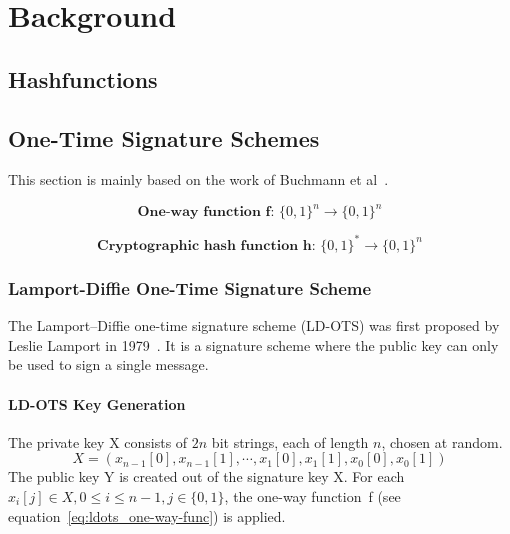 \chapter{Background}
\label{cha:background}


\section{Hashfunctions}

\section{One-Time Signature Schemes}
This section is mainly based on the work of Buchmann et al~\cite{book_pqc_bernstein_2004}.



\begin{equation}
\label{eq:ldots_one-way-func}
\textbf{One-way function f: } \lbrace 0,1 \rbrace^n \rightarrow \lbrace 0,1 \rbrace ^n
\end{equation}

\begin{equation}
\label{eq:ldots_basic_hashfunc}
\textbf{Cryptographic hash function h: } \lbrace 0,1 \rbrace^* \rightarrow \lbrace 0,1 \rbrace^n
\end{equation}

\subsection{Lamport-Diffie One-Time Signature Scheme}
The Lamport–Diffie one-time signature scheme (LD-OTS) was first proposed by Leslie Lamport in 1979~\cite{lamport_signature_scheme_1979}. 
It is a signature scheme where the public key can only be used to sign a single message.


\subsubsection{LD-OTS Key Generation}
The private key X consists of $2n$ bit strings, each of length $n$, chosen at random. %
\begin{equation}
\label{eq:ldots_sign_key}
X = \left(x_{n-1}\left[0\right], x_{n-1}\left[1\right], \cdots, x_{1}\left[0\right], x_{1}\left[1\right], x_{0}\left[0\right], x_{0}\left[1\right] \right)
\end{equation}
The public key Y is created out of the signature key X. For each $x_i[j] \in X, 0 \leq i \leq n-1, j \in \lbrace 0,1 \rbrace$, the one-way function~f (see equation~\ref{eq:ldots_one-way-func}) is applied.


